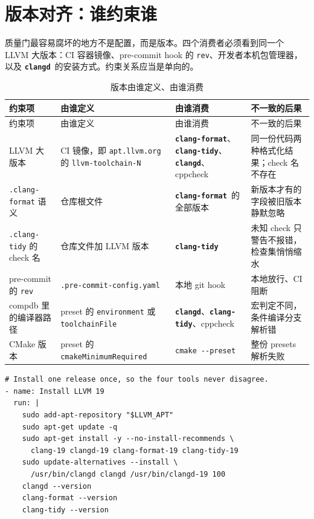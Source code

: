\documentclass[12pt,a4paper,fontset=fandol]{ctexbook}
\newcommand{\Opt}[1]{\texttt{-\/-#1}}
\newcommand{\Lib}[1]{\textbf{\texttt{#1}}}
\newcommand{\Tidy}{\Lib{clang-tidy}}
\newcommand{\Fmt}{\Lib{clang-format}}
\newcommand{\CD}{\Lib{clangd}}
\begin{document}
\section{版本对齐：谁约束谁}\label{sec:ch16-s8}

质量门最容易腐坏的地方不是配置，而是版本。四个消费者必须看到同一个 LLVM 大版本：CI 容器镜像、pre-commit hook 的 \texttt{rev}、开发者本机包管理器，以及 \CD\ 的安装方式。约束关系应当是单向的。

{\footnotesize
\begin{longtable}{@{}>{\raggedright\arraybackslash}p{}
                  >{\raggedright\arraybackslash}p{}
                  >{\raggedright\arraybackslash}p{}
                  >{\raggedright\arraybackslash}p{}@{}}
\caption{版本由谁定义、由谁消费}\label{tab:ch16-ver}\\
\toprule
约束项 & 由谁定义 & 由谁消费 & 不一致的后果 \\
\midrule
\endfirsthead
\toprule
约束项 & 由谁定义 & 由谁消费 & 不一致的后果 \\
\midrule
\endhead
\bottomrule
\endlastfoot
LLVM 大版本 & CI 镜像，即 \texttt{apt.llvm.\allowbreak org} 的 \texttt{llvm-\allowbreak toolchain-\allowbreak N} & \Fmt、\Tidy、\CD、cppcheck & 同一份代码两种格式化结果；check 名不存在 \\
\texttt{.clang-\allowbreak format} 语义 & 仓库根文件 & \Fmt\ 的全部版本 & 新版本才有的字段被旧版本静默忽略 \\
\texttt{.clang-\allowbreak tidy} 的 check 名 & 仓库文件加 LLVM 版本 & \Tidy & 未知 check 只警告不报错，检查集悄悄缩水 \\
pre-commit 的 \texttt{rev} & \texttt{.pre-commit-\allowbreak config.yaml} & 本地 git hook & 本地放行、CI 阻断 \\
compdb 里的编译器路径 & preset 的 \texttt{environment} 或 \texttt{toolchain\allowbreak File} & \CD、\Tidy、cppcheck & 宏判定不同，条件编译分支解析错 \\
CMake 版本 & preset 的 \texttt{cmake\allowbreak Minimum\allowbreak Required} & \texttt{cmake}~\Opt{preset} & 整份 presets 解析失败 \\
\end{longtable}
}

\begin{lstlisting}[style=yamlstyle,caption={用 apt.llvm.org 固定 LLVM 版本}]
# Install one release once, so the four tools never disagree.
- name: Install LLVM 19
  run: |
    sudo add-apt-repository "$LLVM_APT"
    sudo apt-get update -q
    sudo apt-get install -y --no-install-recommends \
      clang-19 clangd-19 clang-format-19 clang-tidy-19
    sudo update-alternatives --install \
      /usr/bin/clangd clangd /usr/bin/clangd-19 100
    clangd --version
    clang-format --version
    clang-tidy --version
\end{lstlisting}
\end{document}
